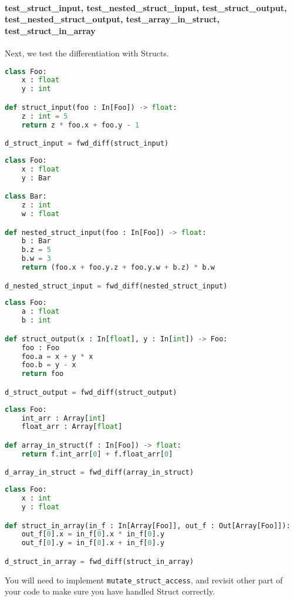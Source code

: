 \paragraph{test_struct_input, test_nested_struct_input, test_struct_output, test_nested_struct_output, test_array_in_struct, test_struct_in_array} Next, we test the differentiation with Structs.
\begin{lstlisting}[language=Python]
class Foo:
    x : float
    y : int

def struct_input(foo : In[Foo]) -> float:
    z : int = 5
    return z * foo.x + foo.y - 1

d_struct_input = fwd_diff(struct_input)
\end{lstlisting}
\begin{lstlisting}[language=Python]
class Foo:
    x : float
    y : Bar

class Bar:
    z : int
    w : float

def nested_struct_input(foo : In[Foo]) -> float:
    b : Bar
    b.z = 5
    b.w = 3
    return (foo.x + foo.y.z + foo.y.w + b.z) * b.w

d_nested_struct_input = fwd_diff(nested_struct_input)
\end{lstlisting}
\begin{lstlisting}[language=Python]
class Foo:
    a : float
    b : int

def struct_output(x : In[float], y : In[int]) -> Foo:
    foo : Foo
    foo.a = x + y * x
    foo.b = y - x
    return foo

d_struct_output = fwd_diff(struct_output)
\end{lstlisting}
\begin{lstlisting}[language=Python]
class Foo:
    int_arr : Array[int]
    float_arr : Array[float]

def array_in_struct(f : In[Foo]) -> float:
    return f.int_arr[0] + f.float_arr[0]

d_array_in_struct = fwd_diff(array_in_struct)
\end{lstlisting}
\begin{lstlisting}[language=Python]
class Foo:
    x : int
    y : float

def struct_in_array(in_f : In[Array[Foo]], out_f : Out[Array[Foo]]):
    out_f[0].x = in_f[0].x * in_f[0].y
    out_f[0].y = in_f[0].x + in_f[0].y

d_struct_in_array = fwd_diff(struct_in_array)
\end{lstlisting}
You will need to implement \lstinline{mutate_struct_access}, and revisit other part of your code to make sure you have handled Struct correctly.

